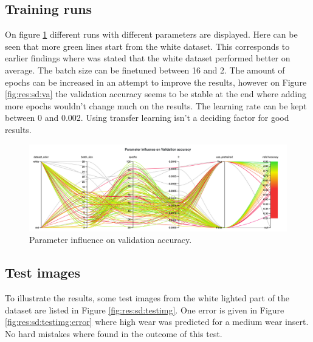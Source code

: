 \subsection{Training runs}
	On figure \ref{fig:res:sd:tr} different runs with different parameters are displayed. Here can be seen that more green lines start from the white dataset. This corresponds to earlier findings where was stated that the white dataset performed better on average. The batch size can be finetuned between 16 and 2. The amount of epochs can be increased in an attempt to improve the results, however on Figure \ref{fig:res:sd:va} the validation accuracy seems to be stable at the end where adding more epochs wouldn't change much on the results. The learning rate can be kept between 0 and 0.002. Using transfer learning isn't a deciding factor for good results. 

	\begin{figure}[hbtp]
		\centering
		\includegraphics[width=\linewidth]{fig/results/wandb/spaghetti_dataset/charts/Section-19-Panel-0-alqny4fc9}
		\caption{Parameter influence on validation accuracy.}	
		\label{fig:res:sd:tr}
	\end{figure}
	
\subsection{Test images}
	To illustrate the results, some test images from the white lighted part of the dataset are listed in Figure \ref{fig:res:sd:testimg}. One error is given in Figure \ref{fig:res:sd:testimg:error} where high wear was predicted for a medium wear insert. No hard mistakes where found in the outcome of this test.

